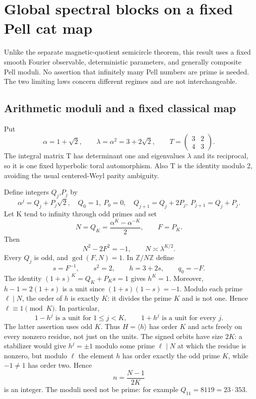 \section{Global spectral blocks on a fixed Pell cat map}\label{sec:pell_blocks}
Unlike the separate magnetic-quotient semicircle theorem, this result uses a fixed smooth Fourier observable, deterministic parameters, and generally composite Pell moduli. No assertion that infinitely many Pell numbers are prime is needed. The two limiting laws concern different regimes and are not interchangeable.

\subsection{Arithmetic moduli and a fixed classical map}\label{pell_blocks:arithmetic-moduli-and-a-fixed-classical-map}

Put \[
 \alpha=1+\sqrt2,\qquad \lambda=\alpha^2=3+2\sqrt2,\qquad
 T=\begin{pmatrix}3&2\\4&3\end{pmatrix}.
\] The integral matrix T has determinant one and eigenvalues \(\lambda\) and its reciprocal, so it is one fixed hyperbolic toral automorphism. Also T is the identity modulo 2, avoiding the usual centered-Weyl parity ambiguity.

Define integers \(Q_{j}\),\(P_{j}\) by \[
 \alpha^j=Q_j+P_j\sqrt2,
 \quad Q_0=1,\ P_0=0,\quad
 Q_{j+1}=Q_j+2P_j,\ P_{j+1}=Q_j+P_j.
\] Let K tend to infinity through odd primes and set \[
 N=Q_K=\frac{\alpha^K-\alpha^{-K}}2,\qquad F=P_K.
\] Then \[
 N^2-2F^2=-1,\qquad N\asymp\lambda^{K/2}.
\] Every \(Q_{j}\) is odd, and \(\gcd(F,N)=1\). In \(\mathbb Z/N\mathbb Z\) define \[
 s=F^{-1},\qquad s^2=2,\qquad h=3+2s,\qquad q_0=-F.
\] The identity \((1+s)^K=Q_K+P_Ks=1\) gives \(h^K=1\). Moreover, \(h-1=2(1+s)\) is a unit since \((1+s)(1-s)=-1\). Modulo each prime \(\ell\mid N\), the order of \(h\) is exactly \(K\): it divides the prime \(K\) and is not one. Hence \(\ell\equiv1\pmod K\). In particular, \[
 1-h^j\text{ is a unit for }1\leq j<K,
 \qquad 1+h^j\text{ is a unit for every }j. \tag{PB.1}
\] The latter assertion uses odd \(K\). Thus \(H=\langle h\rangle\) has order \(K\) and acts freely on every nonzero residue, not just on the units. The signed orbits have size \(2K\): a stabilizer would give \(h^j=\pm1\) modulo some prime \(\ell\mid N\) at which the residue is nonzero, but modulo \(\ell\) the element \(h\) has order exactly the odd prime \(K\), while \(-1\ne1\) has order two. Hence \[
 n=\frac{N-1}{2K}
\] is an integer. The moduli need not be prime: for example \(Q_{11}=8119=23\cdot353\).

